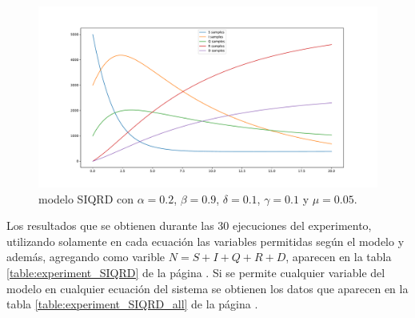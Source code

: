 \begin{figure}[h]
    \centering
    \includegraphics[width=\textwidth]{"figures/SIQRD.pdf"}
    \caption{modelo SIQRD con $\alpha = 0.2$, $\beta = 0.9$, $\delta = 0.1$, $\gamma = 0.1$ y $\mu = 0.05$.}
    \label{fig:SIQRD}
\end{figure}

Los resultados que se obtienen durante las 30 ejecuciones del experimento, utilizando solamente en cada ecuación las variables permitidas según el modelo y además, agregando como varible $N=S + I + Q + R + D$, aparecen en la tabla \ref{table:experiment_SIQRD} de la página \pageref{table:experiment_SIQRD}. Si se permite cualquier variable del modelo en cualquier ecuación del sistema se obtienen los datos que aparecen en la tabla \ref{table:experiment_SIQRD_all} de la página \pageref{table:experiment_SIQRD_all}.

